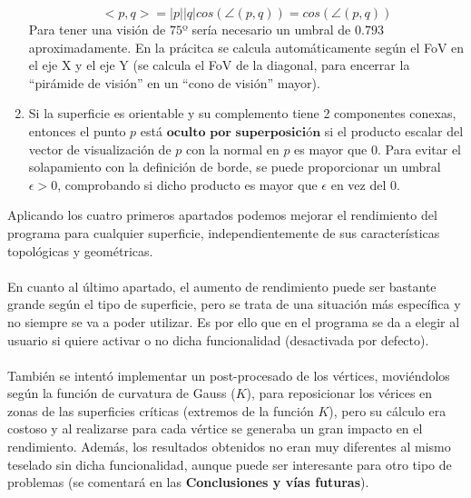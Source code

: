 \begin{enumerate}
		$$<p,q>=|p||q|cos(\angle(p,q))=cos(\angle(p,q))$$
		Para tener una visión de $75$º sería necesario un umbral de $0.793$ aproximadamente. En la prácitca se calcula automáticamente según el FoV en el eje X y el eje Y (se calcula el FoV de la diagonal, para encerrar la ``pirámide de visión'' en un ``cono de visión'' mayor).
		\item Si la superficie es orientable y su complemento tiene 2 componentes conexas, entonces el punto $p$ está $\textbf{oculto por superposición}$ si el producto escalar del vector de visualización de $p$ con la normal en $p$ es mayor que $0$. Para evitar el solapamiento con la definición de borde, se puede proporcionar un umbral $\epsilon>0$, comprobando si dicho producto es mayor que $\epsilon$ en vez del $0$.
	\end{enumerate}
	
	Aplicando los cuatro primeros apartados podemos mejorar el rendimiento del programa para cualquier superficie, independientemente de sus características topológicas y geométricas.\\
	\\En cuanto al último apartado, el aumento de rendimiento puede ser bastante grande según el tipo de superficie, pero se trata de una situación más específica y no siempre se va a poder utilizar. Es por ello que en el programa se da a elegir al usuario si quiere activar o no dicha funcionalidad (desactivada por defecto).\\
	\\También se intentó implementar un post-procesado de los vértices, moviéndolos según la función de curvatura de Gauss ($K$), para reposicionar los vérices en zonas de las superficies críticas (extremos de la función $K$), pero su cálculo era costoso y al realizarse para cada vértice se generaba un gran impacto en el rendimiento. Además, los resultados obtenidos no eran muy diferentes al mismo teselado sin dicha funcionalidad, aunque puede ser interesante para otro tipo de problemas (se comentará en las \textbf{Conclusiones y vías futuras}).
	
	
